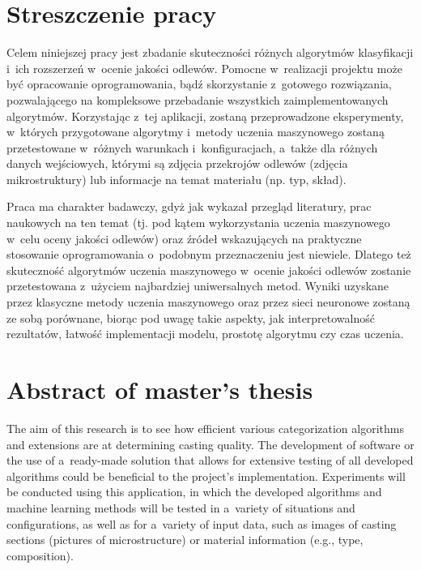 \section*{Streszczenie pracy}

Celem niniejszej pracy jest zbadanie skuteczności różnych algorytmów klasyfikacji i~ich rozszerzeń w~ocenie jakości odlewów. Pomocne w~realizacji projektu może być opracowanie oprogramowania, bądź skorzystanie z~gotowego rozwiązania, pozwalającego na kompleksowe przebadanie wszystkich zaimplementowanych algorytmów. Korzystając z~tej aplikacji, zostaną przeprowadzone eksperymenty, w~których przygotowane algorytmy i~metody uczenia maszynowego zostaną przetestowane w~różnych warunkach i~konfiguracjach, a~także dla różnych danych wejściowych, którymi są zdjęcia przekrojów odlewów (zdjęcia mikrostruktury) lub informacje na temat materiału (np. typ, skład). 

Praca ma charakter badawczy, gdyż jak wykazał przegląd literatury, prac naukowych na ten temat (tj. pod kątem wykorzystania uczenia maszynowego w~celu oceny jakości odlewów) oraz źródeł wskazujących na praktyczne stosowanie oprogramowania o~podobnym przeznaczeniu jest niewiele. Dlatego też skuteczność algorytmów uczenia maszynowego w~ocenie jakości odlewów zostanie przetestowana z~użyciem najbardziej uniwersalnych metod. Wyniki uzyskane przez klasyczne metody uczenia maszynowego oraz przez sieci neuronowe zostaną ze sobą porównane, biorąc pod uwagę takie aspekty, jak interpretowalność rezultatów, łatwość implementacji modelu, prostotę algorytmu czy czas uczenia.


\section*{Abstract of master's thesis}

The aim of this research is to see how efficient various categorization algorithms and extensions are at determining casting quality. The development of software or the use of a~ready-made solution that allows for extensive testing of all developed algorithms could be beneficial to the project's implementation. Experiments will be conducted using this application, in which the developed algorithms and machine learning methods will be tested in a~variety of situations and configurations, as well as for a~variety of input data, such as images of casting sections (pictures of microstructure) or material information (e.g., type, composition).

